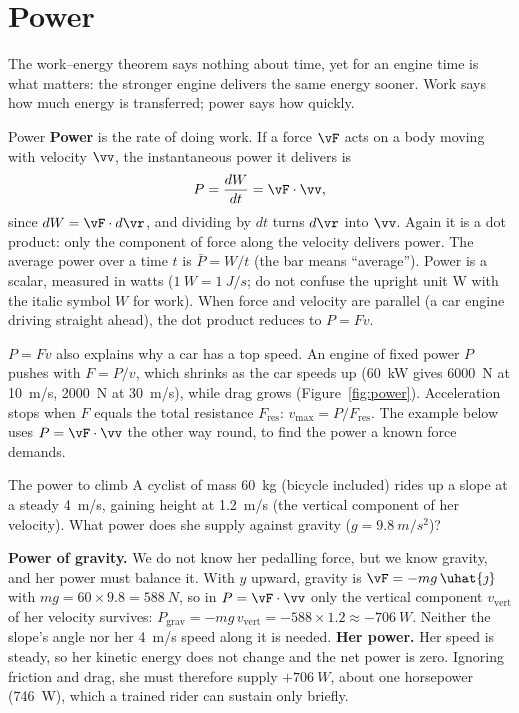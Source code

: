 
\section{Power}

The work--energy theorem says nothing about time, yet for an engine time is what matters: the stronger
engine delivers the same energy sooner. Work says how much energy is transferred; power says how quickly.

\begin{defbox}{Power}
\textbf{Power} is the rate of doing work. If a force $\vF$ acts on a body moving with velocity $\vv$, the
instantaneous power it delivers is
\[
P=\frac{dW}{dt}=\vF\cdot\vv,
\]
since $dW=\vF\cdot d\vr$, and dividing by $dt$ turns $d\vr$ into $\vv$. Again it is a dot product: only
the component of force along the velocity delivers power. The average power
over a time $t$ is $\bar P=W/t$ (the bar means ``average''). Power is a scalar, measured in watts
($\SI{1}{W}=\SI{1}{J/s}$; do not confuse the upright unit W with the italic symbol $W$ for work). When
force and velocity are parallel (a car engine driving straight ahead), the dot product reduces to $P=Fv$.
\end{defbox}

$P=Fv$ also explains why a car has a top speed. An engine of fixed power $P$ pushes with $F=P/v$, which
shrinks as the car speeds up (\SI{60}{kW} gives \SI{6000}{N} at \SI{10}{m/s}, \SI{2000}{N} at
\SI{30}{m/s}), while drag grows (Figure~\ref{fig:power}). Acceleration stops when $F$ equals the total
resistance $F_{\text{res}}$: $v_{\max}=P/F_{\text{res}}$. The example below uses $P=\vF\cdot\vv$ the
other way round, to find the power a known force demands.

\begin{exbox}{The power to climb}
A cyclist of mass \SI{60}{kg} (bicycle included) rides up a slope at a steady \SI{4}{m/s}, gaining
height at \SI{1.2}{m/s} (the vertical component of her velocity). What power does she supply against
gravity ($g=\SI{9.8}{m/s^2}$)?

 \textbf{Power of gravity.} We do not know her pedalling force, but we know gravity, and her
power must balance it. With $y$ upward, gravity is $\vF=-mg\,\uhat{\jmath}$ with
$mg=60\times9.8=\SI{588}{N}$, so in $P=\vF\cdot\vv$ only the vertical component $v_{\text{vert}}$ of her
velocity survives: $P_{\text{grav}}=-mg\,v_{\text{vert}}=-588\times1.2\approx\SI{-706}{W}$. Neither the
slope's angle nor her \SI{4}{m/s} speed along it is needed.
 \textbf{Her power.} Her speed is steady, so her kinetic energy does not change and the net
power is zero. Ignoring friction and drag, she must therefore supply $+\SI{706}{W}$, about one
horsepower (\SI{746}{W}), which a trained rider can sustain only briefly. 
\end{exbox}


